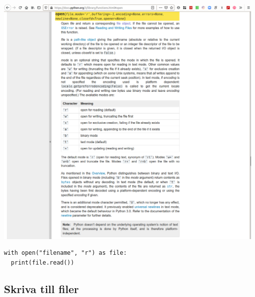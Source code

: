 \begin{frame}
  \includegraphics[width=\columnwidth]{figs/docs-open.png}
\end{frame}


\begin{frame}[fragile]
  \begin{lstlisting}[numbers=none,basicstyle=\Large]
with open("filename", "r") as file:
  print(file.read())
  \end{lstlisting}
\end{frame}

\begin{frame}[fragile]
  \begin{example}
    
  \end{example}
\end{frame}

\subsection{Skriva till filer}

\begin{frame}[fragile]
  \begin{example}
    
  \end{example}
\end{frame}

